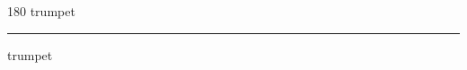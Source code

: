 
\begin{frame}
\begin{center}
\begin{turn}{180}
{\fontsize{2.5cm}{1em}\selectfont trumpet}
\end{turn}
\vspace{1em}\par  
\hrule
\vspace{1em}\par  
{\fontsize{2.5cm}{1em}\selectfont trumpet}
\end{center}
\end{frame}
